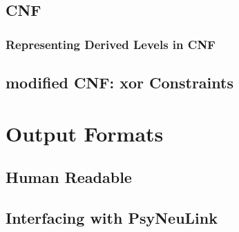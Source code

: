 \subsection{CNF}
\subsubsection{Representing Derived Levels in CNF}
\subsection{modified CNF: xor Constraints}

\section{Output Formats}
\subsection{Human Readable}
\subsection{Interfacing with PsyNeuLink}
